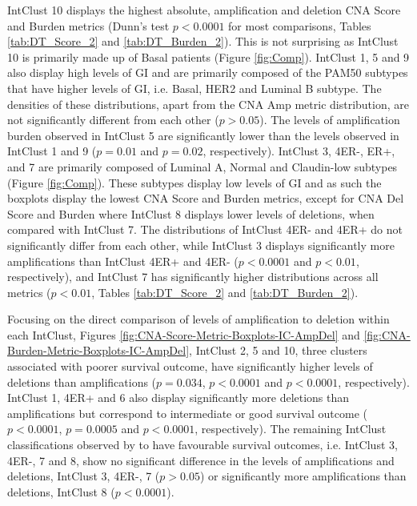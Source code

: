 IntClust 10 displays the highest absolute, amplification and deletion CNA Score and Burden metrics (Dunn’s test $p < 0.0001$ for most comparisons, Tables \ref{tab:DT_Score_2} and \ref{tab:DT_Burden_2}). This is not surprising as IntClust 10 is primarily made up of Basal patients (Figure \ref{fig:Comp}). IntClust 1, 5 and 9 also display high levels of GI and are primarily composed of the PAM50 subtypes that have higher levels of GI, i.e. Basal, HER2 and Luminal B subtype. The densities of these distributions, apart from the CNA Amp metric distribution, are not significantly different from each other ($p > 0.05$). The levels of amplification burden observed in IntClust 5 are significantly lower than the levels observed in IntClust 1 and 9 ($p = 0.01$ and $p = 0.02$, respectively). IntClust 3, 4ER-, ER+, and 7 are primarily composed of Luminal A, Normal and Claudin-low subtypes (Figure \ref{fig:Comp}). These subtypes display low levels of GI and as such the boxplots display the lowest CNA Score and Burden metrics, except for CNA Del Score and Burden where IntClust 8 displays lower levels of deletions, when compared with IntClust 7. The distributions of IntClust 4ER- and 4ER+ do not significantly differ from each other, while IntClust 3 displays significantly more amplifications than IntClust 4ER+ and 4ER- ($p < 0.0001$ and $p < 0.01$, respectively), and IntClust 7 has significantly higher distributions across all metrics ($p < 0.01$, Tables \ref{tab:DT_Score_2} and \ref{tab:DT_Burden_2}).

Focusing on the direct comparison of levels of amplification to deletion within each IntClust, Figures \ref{fig:CNA-Score-Metric-Boxplots-IC-AmpDel} and \ref{fig:CNA-Burden-Metric-Boxplots-IC-AmpDel}, IntClust 2, 5 and 10, three clusters associated with poorer survival outcome, have significantly higher levels of deletions than amplifications ($p = 0.034$, $p < 0.0001$ and $p < 0.0001$, respectively). IntClust 1, 4ER+ and 6 also display significantly more deletions than amplifications but correspond to intermediate or good survival outcome ($p < 0.0001$, $p = 0.0005$ and $p < 0.0001$, respectively). The remaining IntClust classifications observed by \cite{pmid22522925} to have favourable survival outcomes, i.e. IntClust 3, 4ER-, 7 and 8, show no significant difference in the levels of amplifications and deletions, IntClust 3, 4ER-, 7 ($p > 0.05$) or significantly more amplifications than deletions, IntClust 8 ($p < 0.0001$).

